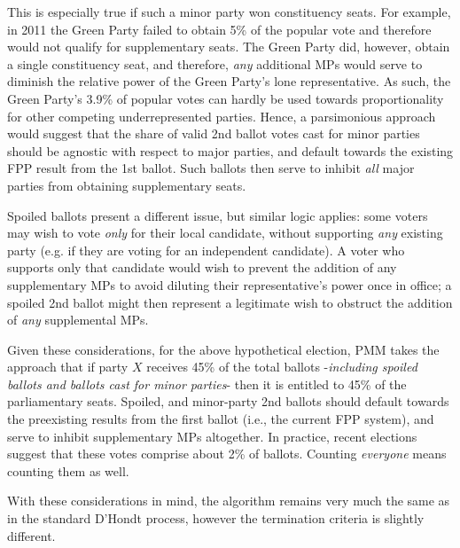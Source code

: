 This is especially true if such a minor party won constituency seats. For example, in 2011 the Green Party failed to obtain 5\% of the popular vote and therefore would not qualify for supplementary seats. The Green Party did, however, obtain a single constituency seat, and therefore, \emph{any} additional MPs would serve to diminish the relative power of the Green Party's lone representative.
As such, the Green Party's 3.9\% of popular votes can hardly be used towards proportionality for other competing underrepresented parties.
Hence, a parsimonious approach would suggest that the share of valid 2nd ballot votes cast for minor parties should be agnostic with respect to major parties, and default towards the existing FPP result from the 1st ballot. Such ballots then serve to inhibit \emph{all} major parties from obtaining supplementary seats.

Spoiled ballots present a different issue, but similar logic applies: some voters may wish to vote \emph{only} for their local candidate, without supporting \emph{any} existing party (e.g. if they are voting for an independent candidate).
A voter who supports only that candidate would wish to prevent the addition of any supplementary MPs to avoid diluting their representative's power once in office; a spoiled 2nd ballot might then represent a legitimate wish to obstruct the addition of \emph{any} supplemental MPs.

Given these considerations, for the above hypothetical election, PMM takes the approach that if party $X$ receives 45\% of the total ballots \--\emph{including spoiled ballots and ballots cast for minor parties}\-- then it is entitled to 45\% of the parliamentary seats.
Spoiled, and minor-party 2nd ballots should default towards the preexisting results from the first ballot (i.e., the current FPP system), and serve to inhibit supplementary MPs altogether.
In practice, recent elections suggest that these votes comprise about 2\% of ballots. Counting \emph{everyone} means counting them as well.

With these considerations in mind, the algorithm remains very much the same as in the standard D'Hondt process, however the termination criteria is slightly different.

